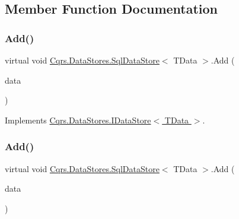 \subsection{Member Function Documentation}
\mbox{\label{classCqrs_1_1DataStores_1_1SqlDataStore_abcca53d2e93dbdfb193a9fb0996849c5_abcca53d2e93dbdfb193a9fb0996849c5}} 
\subsubsection{\texorpdfstring{Add()}{Add()}\hspace{0.1cm}{\footnotesize\ttfamily [1/2]}}
{\footnotesize\ttfamily virtual void \hyperlink{classCqrs_1_1DataStores_1_1SqlDataStore}{Cqrs.\+Data\+Stores.\+Sql\+Data\+Store}$<$ T\+Data $>$.Add (\begin{DoxyParamCaption}\item[{T\+Data}]{data }\end{DoxyParamCaption})\hspace{0.3cm}{\ttfamily [virtual]}}



Implements \hyperlink{interfaceCqrs_1_1DataStores_1_1IDataStore_a114404daaf37fec9cc5547cd9a17858c_a114404daaf37fec9cc5547cd9a17858c}{Cqrs.\+Data\+Stores.\+I\+Data\+Store$<$ T\+Data $>$}.

\mbox{\label{classCqrs_1_1DataStores_1_1SqlDataStore_a45aa105f2571510223c6073804690487_a45aa105f2571510223c6073804690487}} 
\subsubsection{\texorpdfstring{Add()}{Add()}\hspace{0.1cm}{\footnotesize\ttfamily [2/2]}}
{\footnotesize\ttfamily virtual void \hyperlink{classCqrs_1_1DataStores_1_1SqlDataStore}{Cqrs.\+Data\+Stores.\+Sql\+Data\+Store}$<$ T\+Data $>$.Add (\begin{DoxyParamCaption}\item[{I\+Enumerable$<$ T\+Data $>$}]{data }\end{DoxyParamCaption})\hspace{0.3cm}{\ttfamily [virtual]}}




